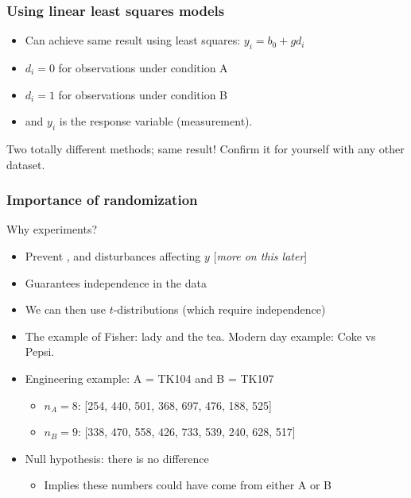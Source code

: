 \begin{frame}\frametitle{Using linear least squares models}
	\begin{itemize}
		\item	Can achieve same result using least squares: $y_i = b_0 + g d_i$
		\item	$d_i = 0$ for observations under condition A
		\item	$d_i=1$ for observations under condition B
		\item	and $y_i$ is the response variable (measurement).
	\end{itemize}
	
	\vspace{12pt}
	{\color{myOrange}{See question in the coming assignment.}}
	
	\vspace{12pt}
	Two totally different methods; same result! Confirm it for yourself with any other dataset.
\end{frame}

\begin{frame}\frametitle{Importance of randomization}

	Why {\color{purple}{randomize}} experiments?
	\begin{itemize}
		\item	Prevent {}, and {} disturbances affecting $y$ {\color{gray}[\emph{more on this later}]}
		\item	Guarantees independence in the data
		\item	We can then use $t$-distributions (which require independence)
	\end{itemize}
	\begin{itemize}
		\item	The example of Fisher: lady and the tea. Modern day example: Coke vs Pepsi.
		\item	Engineering example: A = TK104 and B = TK107
		\begin{itemize}
			\item	$n_A = 8$: [254, 440, 501, 368, 697, 476, 188, 525]
			\item	$n_B = 9$: [338, 470, 558, 426, 733, 539, 240, 628, 517]
		\end{itemize}
		\item	Null hypothesis: there is no difference
		\begin{itemize}
			\item	Implies these numbers could have come from either A or B
		\end{itemize}
	\end{itemize}
	{}
\end{frame}

